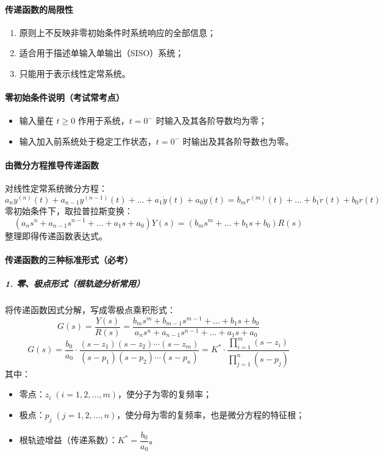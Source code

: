 \paragraph{传递函数的局限性}
\begin{enumerate}
    \item 原则上不反映非零初始条件时系统响应的全部信息；
    \item 适合用于描述单输入单输出（SISO）系统；
    \item 只能用于表示线性定常系统。
\end{enumerate}

\medskip

\paragraph{零初始条件说明（考试常考点）}
\begin{itemize}
    \item 输入量在 $t\ge0$ 作用于系统，$t=0^-$ 时输入及其各阶导数均为零；
    \item 输入加入前系统处于稳定工作状态，$t=0^-$ 时输出及其各阶导数也为零。
\end{itemize}

\medskip

\paragraph{由微分方程推导传递函数}
对线性定常系统微分方程：
\[
a_n y^{(n)}(t) + a_{n-1} y^{(n-1)}(t) + \dots + a_1 \dot{y}(t) + a_0 y(t) = b_m r^{(m)}(t) + \dots + b_1 \dot{r}(t) + b_0 r(t)
\]
零初始条件下，取拉普拉斯变换：
\[
(a_n s^n + a_{n-1} s^{n-1} + \dots + a_1 s + a_0)Y(s) = (b_m s^m + \dots + b_1 s + b_0)R(s)
\]
整理即得传递函数表达式。

\medskip

\paragraph{传递函数的三种标准形式（必考）}
\subparagraph{1. 零、极点形式（根轨迹分析常用）}
将传递函数因式分解，写成零极点乘积形式：
\[
G(s) = \frac{Y(s)}{R(s)} = \frac{b_m s^m + b_{m-1} s^{m-1} + \dots + b_1 s + b_0}{a_n s^n + a_{n-1} s^{n-1} + \dots + a_1 s + a_0}
\]
\[
G(s) = \frac{b_0}{a_0} \cdot \frac{(s-z_1)(s-z_2)\cdots(s-z_m)}{(s-p_1)(s-p_2)\cdots(s-p_n)} = K^* \cdot \frac{\prod_{i=1}^m (s-z_i)}{\prod_{j=1}^n (s-p_j)}
\]
其中：
\begin{itemize}
    \item 零点：$z_i\;(i=1,2,\dots,m)$，使分子为零的复频率；
    \item 极点：$p_j\;(j=1,2,\dots,n)$，使分母为零的复频率，也是微分方程的特征根；
    \item 根轨迹增益（传递系数）：$K^* = \dfrac{b_0}{a_0}$。
\end{itemize}

